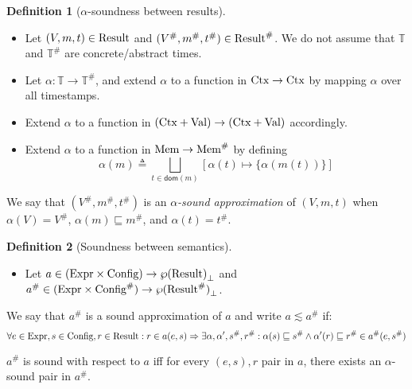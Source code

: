 \documentclass[acmsmall,screen,review]{acmart}
\theoremstyle{definition}
\newtheorem{definition}{Definition}[section]
\newcommand*{\A}[1]{{#1}^{\#}}
\newcommand*{\Expr}{\text{Expr}}
\newcommand*{\Time}{\mathbb{T}}
\newcommand*{\ATime}{\A{\Time}}
\newcommand*{\Ctx}[1]{\text{Ctx}\vphantom{#1}}
\newcommand*{\Value}[1]{\text{Val}\vphantom{#1}}
\newcommand*{\Mem}[1]{\text{Mem}\vphantom{#1}}
\newcommand*{\mem}{m}
\newcommand*{\AMem}[1]{\A{\text{Mem}}\vphantom{#1}}
\newcommand*{\Config}[1]{\text{Config}\vphantom{#1}}
\newcommand*{\AConfig}[1]{\A{\text{Config}}\vphantom{#1}}
\newcommand*{\Result}[1]{\text{Result}\vphantom{#1}}
\newcommand*{\AResult}[1]{\A{\text{Result}}\vphantom{#1}}
\begin{document}
\begin{definition}[$\alpha$-soundness between results]
  $\:$

  \begin{itemize}
    \item Let $(V,\mem,t)\in\Result{\Time}$ and $(\A{V},\A\mem,\A{t})\in\AResult{\ATime}$. We do not assume that $\Time$ and $\ATime$ are concrete/abstract times.
    \item Let $\alpha:\Time\rightarrow\ATime$, and extend $\alpha$ to a function in $\Ctx{\Time}\rightarrow\Ctx{\ATime}$ by mapping $\alpha$ over all timestamps.
    \item Extend $\alpha$ to a function in $(\Ctx{\Time}+\Value{\Time})\rightarrow(\Ctx{\ATime}+\Value{\ATime})$ accordingly.
    \item Extend $\alpha$ to a function in $\Mem{\Time}\rightarrow\AMem{\ATime}$ by defining
          \[\alpha(\mem)\triangleq\bigsqcup_{t\in\mathsf{dom}(\mem)}[\alpha(t)\mapsto\{\alpha(\mem(t))\}]\]
  \end{itemize}

  We say that $(\A{V},\A\mem,\A{t})$ is an \emph{$\alpha$-sound approximation} of $(V,\mem,t)$ when $\alpha(V)=\A{V}$, $\alpha(\mem)\sqsubseteq\A\mem$, and $\alpha(t)=\A{t}$.
\end{definition}

\begin{definition}[Soundness between semantics]
  $\:$

  \begin{itemize}
    \item Let $a\in(\Expr\times\Config{\Time})\rightarrow{\wp(\Result{\Time})}_{\bot}$ and $\A{a}\in(\Expr\times\AConfig{\ATime})\rightarrow{\wp(\AResult{\ATime})}_{\bot}$.
  \end{itemize}

  We say that $\A{a}$ is a sound approximation of $a$ and write $a\lesssim\A{a}$ if:
  \[
    \forall e\in\Expr,s\in\Config{\Time},r\in\Result{\Time}:r\in a(e,s)\Rightarrow\exists\alpha,\alpha',\A{s},\A{r}:\alpha(s)\sqsubseteq\A{s}\wedge\alpha'(r)\sqsubseteq\A{r}\in\A{a}(e,\A{s})
  \]

  $\A{a}$ is sound with respect to $a$ iff for every $(e,s), r$ pair in $a$, there exists an $\alpha$-sound pair in $\A{a}$.
\end{definition}
\end{document}
